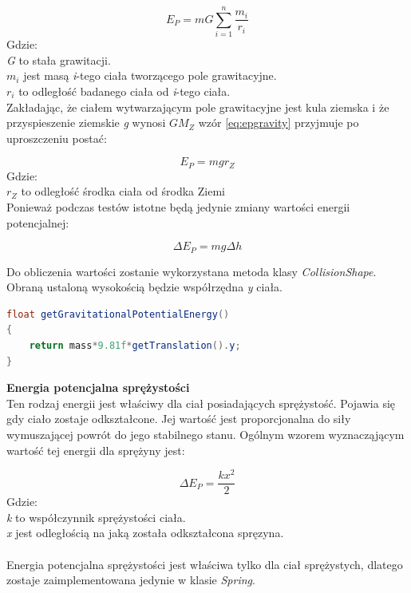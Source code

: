 \begin{equation}
E_{P} = mG\sum_{i=1}^{n}\frac{m_{i}}{r_{i}}
\label{eq:epgravity}
\end{equation}
Gdzie:\\
\emph{G} to stała grawitacji.\\
$ m_{i} $ jest masą \emph{i}-tego ciała tworzącego pole grawitacyjne.\\
$ r_{i} $ to odległość badanego ciała od \emph{i}-tego ciała.\\

Zakładając, że ciałem wytwarzającym pole grawitacyjne jest kula ziemska i że
przyspieszenie ziemskie \emph{g} wynosi $ GM_{Z} $ wzór
\ref{eq:epgravity} przyjmuje po uproszczeniu postać:

\begin{equation}
E_{P} = mgr_{Z}
\end{equation}
Gdzie:\\
$ r_{Z} $ to odległość środka ciała od środka Ziemi\\
Ponieważ podczas testów istotne będą jedynie zmiany wartości energii
potencjalnej:

\begin{equation}
\Delta E_{P} = mg\Delta h
\end{equation}

Do obliczenia wartości zostanie wykorzystana metoda klasy \emph{CollisionShape}.
Obraną ustaloną wysokością będzie współrzędna \emph{y} ciała.
\newpage
\begin{lstlisting}[language=Java,
caption=Fragment pliku CollisionShape.java,label=lis:epgravity]
float getGravitationalPotentialEnergy()
{
	return mass*9.81f*getTranslation().y;
}
\end{lstlisting}

\textbf{Energia potencjalna sprężystości}\\
Ten rodzaj energii jest właściwy dla ciał posiadających sprężystość. Pojawia się
gdy ciało zostaje odkształcone. Jej wartość jest proporcjonalna do siły
wymuszającej powrót do jego stabilnego stanu. Ogólnym wzorem wyznacząjącym
wartość tej energii dla sprężyny jest:

\begin{equation}
\Delta E_{P} = \frac{kx^{2}}{2}
\end{equation}
Gdzie:\\
\emph{k} to współczynnik sprężystości ciała.\\
\emph{x} jest odległością na jaką została odkształcona spręzyna.\\
 \\
Energia potencjalna sprężystości jest właściwa tylko dla ciał sprężystych,
dlatego zostaje zaimplementowana jedynie w klasie \emph{Spring}.

